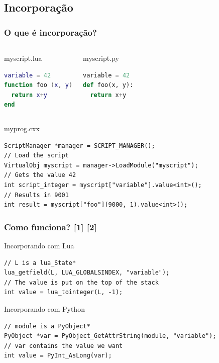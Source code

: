 \documentclass[brazil]{beamer}
\begin{document}
\subsection{Incorporação}
\begin{frame}[fragile]
  \frametitle{O que é incorporação?}
  \pause
  \begin{columns}
      \begin{block}{myscript.lua}
        \begin{lstlisting}[language=lua]
variable = 42
function foo (x, y)
  return x+y
end
        \end{lstlisting}
      \end{block}
    \pause
      \begin{block}{myscript.py}
        \begin{lstlisting}[language=python]
variable = 42
def foo(x, y):
  return x+y
        \end{lstlisting}
      \end{block}
  \end{columns}
  \pause
  \begin{block}{myprog.cxx}
    \begin{lstlisting}
ScriptManager *manager = SCRIPT_MANAGER();
// Load the script
VirtualObj myscript = manager->LoadModule("myscript");
// Gets the value 42
int script_integer = myscript["variable"].value<int>();
// Results in 9001
int result = myscript["foo"](9000, 1).value<int>();
    \end{lstlisting}
  \end{block}
\end{frame}
\begin{frame}[fragile]
  \frametitle{Como funciona? [1] [2]}
  \pause
  \begin{block}{Incorporando com Lua}
    \begin{lstlisting}
// L is a lua_State*
lua_getfield(L, LUA_GLOBALSINDEX, "variable");
// The value is put on the top of the stack
int value = lua_tointeger(L, -1);
    \end{lstlisting}
  \end{block}
  \pause
  \begin{block}{Incorporando com Python}
    \begin{lstlisting}
// module is a PyObject*
PyObject *var = PyObject_GetAttrString(module, "variable");
// var contains the value we want
int value = PyInt_AsLong(var);
    \end{lstlisting}
  \end{block}
\end{frame}
\end{document}
